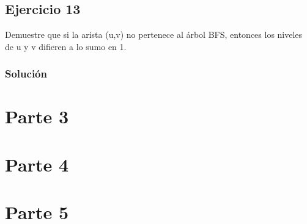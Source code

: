 \documentclass{article}
\begin{document}
\subsection*{Ejercicio 13}
Demuestre que si la arista (u,v) no pertenece al árbol BFS, entonces los niveles de u y v difieren a lo sumo en 1.
\subsubsection*{Solución}


\section*{Parte 3}
\section*{Parte 4}
\section*{Parte 5}
\end{document}
